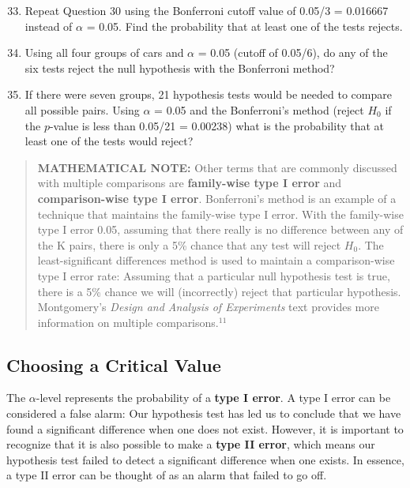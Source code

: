 \documentclass[
]{report}
\begin{document}
\begin{enumerate}
  \setcounter{enumi}{32}
  \item Repeat Question 30 using the Bonferroni cutoff value of 0.05/3 = 0.016667 instead of $\scriptstyle \alpha$ = 0.05. Find the probability that at least one of the tests rejects.
  \item Using all four groups of cars and $\scriptstyle \alpha$ = 0.05 (cutoff of 0.05/6), do any of the six tests reject the null hypothesis with the Bonferroni method?
  \item If there were seven groups, 21 hypothesis tests would be needed to compare all possible pairs. Using $\scriptstyle \alpha$ = 0.05 and the Bonferroni’s method (reject $\scriptstyle H_0$ if the $\scriptstyle p$-value is less than 0.05/21 = 0.00238) what is the probability that at least one of the tests would reject?
\end{enumerate}

\begin{quote}
\textbf{MATHEMATICAL NOTE:} Other terms that are commonly discussed with multiple comparisons are \textbf{family-wise type I error} and \textbf{comparison-wise type I error}. Bonferroni's method is an example of a technique that maintains the family-wise type I error. With the family-wise type I error 0.05, assuming that there really is no difference between any of the K pairs, there is only a 5\% chance that any test will reject \(\scriptstyle H_0\). The least-significant differences method is used to maintain a comparison-wise type I error rate: Assuming that a particular null hypothesis test is true, there is a 5\% chance we will (incorrectly) reject that particular hypothesis. Montgomery's \emph{Design and Analysis of Experiments} text provides more information on multiple comparisons.\(^{11}\)
\end{quote}

\hypertarget{choosing-a-critical-value}{%
\subsection*{Choosing a Critical Value}\label{choosing-a-critical-value}}

The \(\scriptstyle \alpha\)-level represents the probability of a \textbf{type I error}. A type I error can be considered a false alarm: Our hypothesis test has led us to conclude that we have found a significant difference when one does not exist. However, it is important to recognize that it is also possible to make a \textbf{type II error}, which means our hypothesis test failed to detect a significant difference when one exists. In essence, a type II error can be thought of as an alarm that failed to go off.
\end{document}
